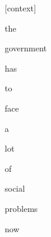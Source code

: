\documentclass[varwidth]{standalone}
\begin{document}
\begin{CJK*}{UTF8}{gbsn}
{\setlength{\fboxsep}{0pt}\colorbox{white!0}{\parbox{0.9\textwidth}{
\colorbox{red!2.4811460178075784e-11}{\strut [context]} \colorbox{red!7.549920133520516e-10}{\strut the} \colorbox{red!2.946529775726958e-07}{\strut government} \colorbox{red!1.768055881257169e-06}{\strut has} \colorbox{red!1.6982367014861666e-05}{\strut to} \colorbox{red!3.575397204258479e-05}{\strut face} \colorbox{red!1.543306643725373e-05}{\strut a} \colorbox{red!0.0002884191053453833}{\strut lot} \colorbox{red!4.1581552068237215e-05}{\strut of} \colorbox{red!0.6631280183792114}{\strut social} \colorbox{red!97.98706817626953}{\strut problems} \colorbox{red!1.3494051694869995}{\strut now} 
}}}
\end{CJK*}
\end{document}
